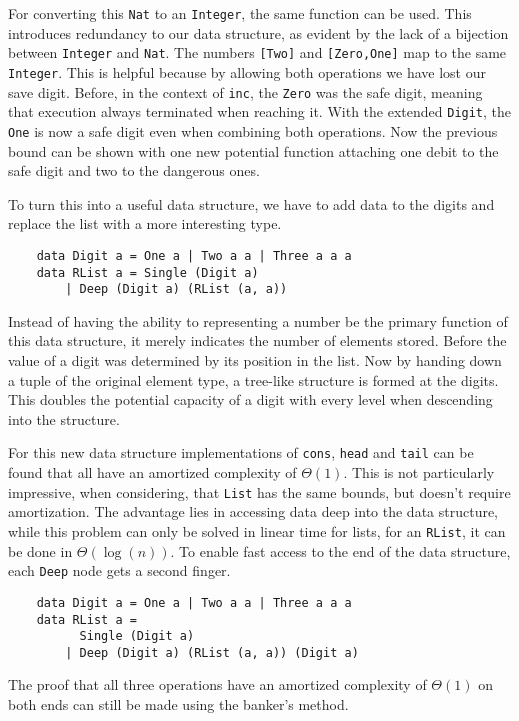 For converting this \texttt{Nat} to an \texttt{Integer}, the same function can be used. This introduces redundancy to our data structure, as evident by the lack of a bijection between \texttt{Integer} and \texttt{Nat}. The numbers \texttt{[Two]} and \texttt{[Zero,One]} map to the same \texttt{Integer}. This is helpful because by allowing both operations we have lost our save digit. Before, in the context of \texttt{inc}, the \texttt{Zero} was the safe digit, meaning that execution always terminated when reaching it. With the extended \texttt{Digit}, the \texttt{One} is now a safe digit even when combining both operations. Now the previous bound can be shown with one new potential function attaching one debit to the safe digit and two to the dangerous ones.\par
To turn this into a useful data structure, we have to add data to the digits and replace the list with a more interesting type.
\begin{verbatim}
    data Digit a = One a | Two a a | Three a a a
    data RList a = Single (Digit a) 
        | Deep (Digit a) (RList (a, a))
\end{verbatim}
Instead of having the ability to representing a number be the primary function of this data structure, it merely indicates the number of elements stored. Before the value of a digit was determined by its position in the list. Now by handing down a tuple of the original element type, a tree-like structure is formed at the digits. This doubles the potential capacity of a digit with every level when descending into the structure.\par
For this new data structure implementations of \texttt{cons}, \texttt{head} and \texttt{tail} can be found that all have an amortized complexity of \(\Theta(1)\). This is not particularly impressive, when considering, that \texttt{List} has the same bounds, but doesn't require amortization. The advantage lies in accessing data deep into the data structure, while this problem can only be solved in linear time for lists, for an \texttt{RList}, it can be done in \(\Theta(\log (n))\). To enable fast access to the end of the data structure, each \texttt{Deep} node gets a second finger.
\begin{verbatim}
    data Digit a = One a | Two a a | Three a a a
    data RList a =
          Single (Digit a)
        | Deep (Digit a) (RList (a, a)) (Digit a) 
\end{verbatim}
The proof that all three operations have an amortized complexity of \(\Theta(1)\) on both ends can still be made using the banker's method.

